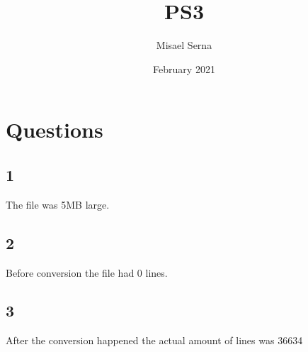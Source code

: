 \documentclass{article}
\title{PS3}
\author{Misael Serna}
\date{February 2021}
\begin{document}
\maketitle

\section{Questions}
\subsection{1}
The file was 5MB large.
\subsection{2}
Before conversion the file had 0 lines.
\subsection{3}
After the conversion happened the actual amount of lines was 36634
\end{document}
